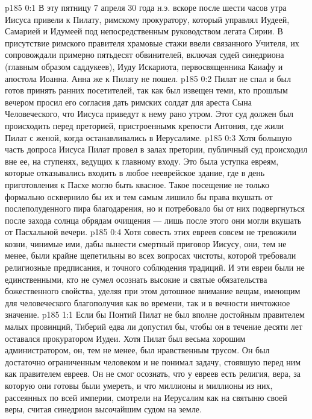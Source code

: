 \vs p185 0:1 В эту пятницу 7 апреля 30 года н.э. вскоре после шести часов утра Иисуса привели к Пилату, римскому прокуратору, который управлял Иудеей, Самарией и Идумеей под непосредственным руководством легата Сирии. В присутствие римского правителя храмовые стажи ввели связанного Учителя, их сопровождали примерно пятьдесят обвинителей, включая судей синедриона (главным образом саддукеев), Иуду Искариота, первосвященника Каиафу и апостола Иоанна. Анна же к Пилату не пошел.
\vs p185 0:2 Пилат не спал и был готов принять ранних посетителей, так как был извещен теми, кто прошлым вечером просил его согласия дать римских солдат для ареста Сына Человеческого, что Иисуса приведут к нему рано утром. Этот суд должен был происходить перед преторией, пристроеннымк крепости Антония, где жили Пилат с женой, когда останавливались в Иерусалиме.
\vs p185 0:3 Хотя большую часть допроса Иисуса Пилат провел в залах претории, публичный суд происходил вне ее, на ступенях, ведущих к главному входу. Это была уступка евреям, которые отказывались входить в любое нееврейское здание, где в день приготовления к Пасхе могло быть квасное. Такое посещение не только формально осквернило бы их и тем самым лишило бы права вкушать от послеполуденного пира благодарения, но и потребовало бы от них подвергнуться после захода солнца обрядам очищения --- лишь после этого они могли вкушать от Пасхальной вечери.
\vs p185 0:4 Хотя совесть этих евреев совсем не тревожили козни, чинимые ими, дабы вынести смертный приговор Иисусу, они, тем не менее, были крайне щепетильны во всех вопросах чистоты, которой требовали религиозные предписания, и точного соблюдения традиций. И эти евреи были не единственными, кто не сумел осознать высокие и святые обязательства божественного свойства, уделяя при этом дотошное внимание вещам, имеющим для человеческого благополучия как во времени, так и в вечности ничтожное значение.
\vs p185 1:1 Если бы Понтий Пилат не был вполне достойным правителем малых провинций, Тиберий едва ли допустил бы, чтобы он в течение десяти лет оставался прокуратором Иудеи. Хотя Пилат был весьма хорошим администратором, он, тем не менее, был нравственным трусом. Он был достаточно ограниченным человеком и не понимал задачу, стоявшую перед ним как правителем евреев. Он не смог осознать, что у евреев есть  религия, вера, за которую они готовы были умереть, и что миллионы и миллионы из них, рассеянных по всей империи, смотрели на Иерусалим как на святыню своей веры, считая синедрион высочайшим судом на земле.
